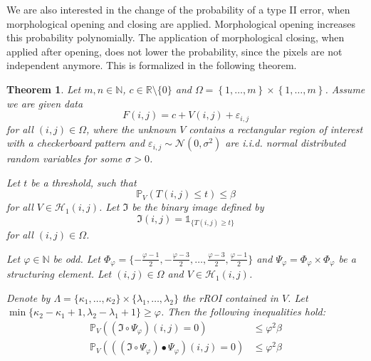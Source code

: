 \documentclass[a4paper,12pt]{article}
\theoremstyle{plain}
\newtheorem{theorem}{Theorem}[section]
\theoremstyle{definition}
\begin{document}
We are also interested in the change of the probability of a type II error, when morphological opening and closing are applied. Morphological opening increases this probability polynomially. The application of morphological closing, when applied after opening, does not lower the probability, since the pixels are not independent anymore. This is formalized in the following theorem.

\begin{theorem}
	Let $m, n \in \mathbb{N}$, $c \in \mathbb{R} \setminus \{ 0 \}$ and $\Omega = \left\{ 1, \dots, m \right\} \times \left\{ 1, \dots, m \right\}$. Assume we are given data
	\begin{equation*}
		F(i, j) = c + V(i, j) + \varepsilon_{i, j}
	\end{equation*}
	for all $(i, j) \in \Omega$, where the unknown $V$ contains a rectangular region of interest with a checkerboard pattern and $\varepsilon_{i, j} \sim \mathcal{N}(0, \sigma^2)$ are i.i.d. normal distributed random variables for some $\sigma > 0$.
	
	Let $t$ be a threshold, such that
	\begin{equation*}
		\mathbb{P}_V\left( T(i, j) \leq t \right) \leq \beta
	\end{equation*}
	for all $V \in \mathcal{H}_1(i, j)$. Let $\mathfrak{I}$ be the binary image defined by
	\begin{equation}
		\mathfrak{I}(i, j) = \mathds{1}_{ \{ T(i, j) \geq t \} }
	\end{equation}
	for all $(i, j) \in \Omega$.
	
	Let $\varphi \in \mathbb{N}$ be odd. Let $\Phi_\varphi = \{ -\frac{\varphi - 1}{2}, -\frac{\varphi - 3}{2}, \dots, \frac{\varphi - 3}{2}, \frac{\varphi - 1}{2} \}$ and $\Psi_\varphi = \Phi_\varphi \times \Phi_\varphi$ be a structuring element. Let $(i, j) \in \Omega$ and $V \in \mathcal{H}_1(i, j)$.
	
	Denote by $\varLambda = \{ \kappa_1, \dots, \kappa_2 \} \times \{ \lambda_1, \dots, \lambda_2 \}$ the rROI contained in $V$. Let $\min \{ \kappa_2 - \kappa_1 + 1, \lambda_2 - \lambda_1 + 1 \} \geq \varphi$.
	Then the following inequalities hold:
	\begin{align}
		\mathbb{P}_V\left( (\mathfrak{I} \circ \Psi_\varphi)(i, j) = 0 \right) &\leq \varphi^2 \beta \\
		\mathbb{P}_V\left( ((\mathfrak{I} \circ \Psi_\varphi) \bullet \Psi_\varphi)(i, j) = 0 \right) &\leq \varphi^2 \beta
	\end{align}
\end{theorem}
\end{document}
